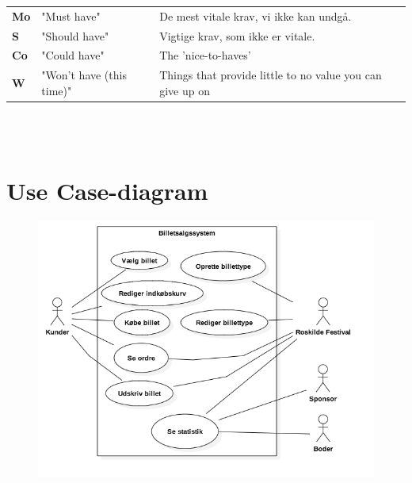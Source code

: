 \begin{tabular}{lll}
    \textbf{Mo} &   
    "Must have"                 &
    De mest vitale krav, vi ikke kan undgå. \\

    \textbf{S}  &   
    "Should have"               & 
    Vigtige krav, som ikke er vitale. \\

    \textbf{Co} &   
    "Could have"                & 
    The 'nice-to-haves' \\

    \textbf{W}  &   
    "Won’t have (this time)"    & 
    Things that provide little to no value you can give up on \\

\end{tabular}
\\\\

\section{Use Case-diagram}
\begin{figure}[H]
    \begin{center}
        \includegraphics[width=1\textwidth]{UseCaseDiagram.png}
    \end{center}
\end{figure}

